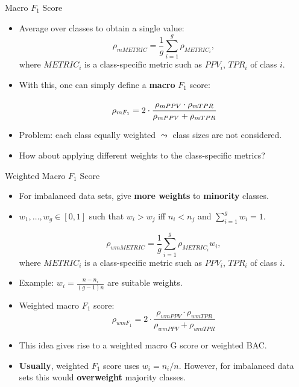 \documentclass[11pt,compress,t,notes=noshow, aspectratio=169, xcolor=table]{beamer}
\begin{document}
\begin{frame}{Macro $F_1$ Score}
	
	\small{

    	\begin{itemize}
    
    		\item Average over classes to obtain a single value:
            $$\rho_{mMETRIC} = \frac{1}{g}\sum_{i=1}^g \rho_{METRIC_i},$$
            where $METRIC_i$ is a class-specific metric such as $PPV_i$, $TPR_i$ of class $i$.
    		
    	
    		\item With this, one can simply define a \textbf{macro} $F_1$ score:
    	
    		$$\rho_{mF_1} = 2 \cdot \cfrac{\rho_{mPPV} \cdot \rho_{mTPR}}{\rho_{mPPV} + 
    			\rho_{mTPR}}$$
    
    		\item Problem: each class equally weighted $\leadsto$ class sizes are not considered.
    
            \item How about applying different weights to the class-specific metrics?

    	\end{itemize}
	}
\end{frame}

\begin{frame}{Weighted Macro $F_1$ Score}

	\small{

    	\begin{itemize}
    
    		\item For imbalanced data sets, give \textbf{more weights} to \textbf{minority} classes.
      
            \item $w_1,\ldots,w_g \in[0,1]$  such that $w_i > w_j$ iff $n_i < n_j$ and $\sum_{i=1}^g w_i = 1.$
    
            $$\rho_{wmMETRIC} = \frac{1}{g}\sum_{i=1}^g \rho_{METRIC_i} w_i,$$
            where $METRIC_i$ is a class-specific metric such as $PPV_i$, $TPR_i$ of class $i$.
    	 
    		\item Example: $w_i = \frac{n - n_i}{(g-1)n}$ are suitable weights.
    
    		\item Weighted macro $F_1$ score:	
    		$$\rho_{wmF_1} = 2 \cdot \frac{\rho_{wmPPV} \cdot \rho_{wmTPR}}{\rho_{wmPPV} + \rho_{wmTPR}}$$
      
    		\item This idea gives rise to a weighted macro G score or weighted BAC.
    	
    		\item \textbf{Usually}, weighted $F_1$ score uses $w_i = n_i/n$. However, for imbalanced data sets this would \textbf{overweight} majority classes.
    
    	\end{itemize}
	}
\end{frame}
\end{document}
